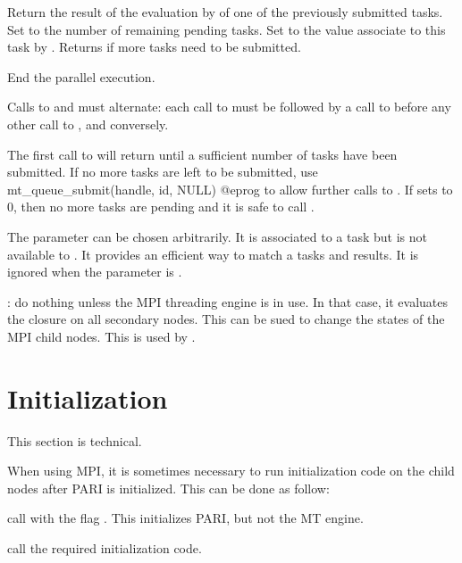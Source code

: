 Return the result of the evaluation by  of one of the previously
submitted tasks. Set  to the number of remaining pending tasks.
Set  to the value associate to this task by
.  Returns  if more tasks need to be
submitted.

 End the parallel execution.

Calls to  and  must alternate: each
call to  must be followed by a call to
 before any other call to ,
and conversely.

The first call to  will return  until a
sufficient number of tasks have been submitted. If no more tasks are left
to be submitted, use
\bprog
  mt_queue_submit(handle, id, NULL)
@eprog\noindent
to allow further calls to .  If  sets
 to $0$, then no more tasks are pending and it is safe to call
.

The parameter  can be chosen arbitrarily. It is associated to a
task but is not available to .  It provides an efficient way to
match a tasks and results. It is ignored when the parameter  is
.


: do nothing unless the MPI threading engine
is in use. In that case, it evaluates the closure   on all secondary
nodes. This can be sued to change the states of the MPI child nodes.
This is used by .

\section{Initialization}

This section is technical.

 \label{pari_mt_init}
When using MPI, it is sometimes necessary to run initialization code on the
child nodes after PARI is initialized. This can be done as follow:

\item call  with the flag .
This initializes PARI, but not the MT engine.

\item call the required initialization code.

